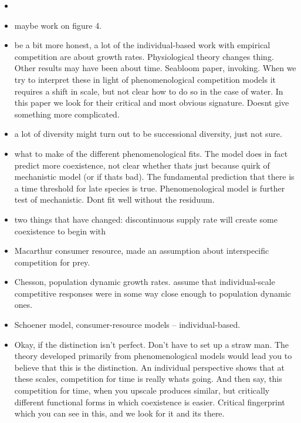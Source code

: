 \documentclass[11pt]{article}
\begin{document}
\begin{itemize}
\item 


\item maybe work on figure 4.

\item be a bit more honest, a lot of the individual-based work with empirical competition are about growth rates. Physiological theory changes thing. Other results may have been about time. Seabloom paper, invoking. When we try to interpret these in light of phenomenological competition models it requires a shift in scale, but not clear how to do so in the case of water. In this paper we look for their critical and most obvious signature. Doesnt give something more complicated.

\item a lot of diversity might turn out to be successional diversity, just not sure.

\item what to make of the different phenomenological fits. The model does in fact predict more coexistence, not clear whether thats just because quirk of mechanistic model (or if thats bad). The fundamental prediction that there is a time threshold for late species is true. Phenomenological model is further test of mechanistic. Dont fit well without the residuum.

\item two things that have changed: discontinuous supply rate will create some coexistence to begin with

\item Macarthur consumer resource, made an assumption about interspecific competition for prey.

\item Chesson, population dynamic growth rates. assume that individual-scale competitive responses were in some way close enough to population dynamic ones.

\item Schoener model, consumer-resource models -- individual-based.

\item Okay, if the distinction isn't perfect. Don't have to set up a straw man. The theory developed primarily from phenomenological models would lead you to believe that this is the distinction. An individual perspective shows that at these scales, competition for time is really whats going. And then say, this competition for time, when you upscale produces similar, but critically different functional forms in which coexistence is easier. Critical fingerprint which you can see in this, and we look for it and its there.


\end{itemize}
\end{document}

